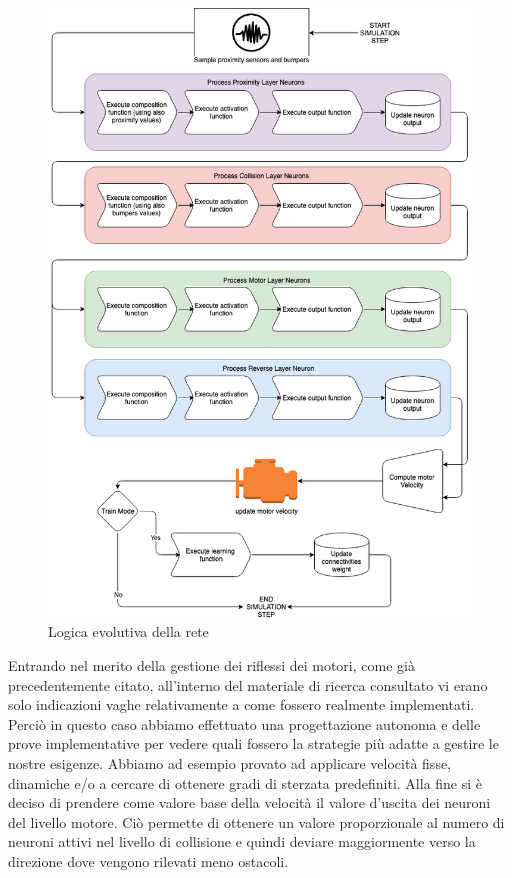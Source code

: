 \begin{figure}[H]
    \centering
    \includegraphics[scale=0.45]{figures/SimulationStep.png}
    \caption{Logica evolutiva della rete}
    \label{fig:evolutionLogic}
\end{figure}

Entrando nel merito della gestione dei riflessi dei motori, come già precedentemente citato, all'interno del materiale di ricerca consultato vi erano solo indicazioni vaghe relativamente a come fossero realmente implementati. 
Perciò in questo caso abbiamo effettuato una progettazione autonoma e delle prove implementative per vedere quali fossero la strategie più adatte a gestire le nostre esigenze. Abbiamo ad esempio provato ad applicare velocità fisse, dinamiche e/o a cercare di ottenere gradi di sterzata predefiniti.
Alla fine si è deciso di prendere come valore base della velocità il valore d'uscita dei neuroni del livello motore. Ciò permette di ottenere un valore proporzionale al numero di neuroni attivi nel livello di collisione e quindi deviare maggiormente verso la direzione dove vengono rilevati meno ostacoli.

